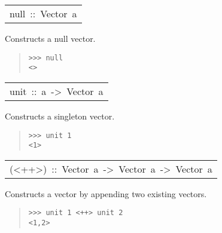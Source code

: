\begin{haddockdesc}
\item[\begin{tabular}{@{}l}
null\ ::\ Vector\ a
\end{tabular}]\haddockbegindoc
Constructs a null vector.\par
\begin{quote}
{\haddockverb\begin{verbatim}
>>> null
<>

\end{verbatim}}
\end{quote}
\end{haddockdesc}
\begin{haddockdesc}
\item[\begin{tabular}{@{}l}
unit\ ::\ a\ ->\ Vector\ a
\end{tabular}]\haddockbegindoc
Constructs a singleton vector.\par
\begin{quote}
{\haddockverb\begin{verbatim}
>>> unit 1
<1>

\end{verbatim}}
\end{quote}
\end{haddockdesc}
\begin{haddockdesc}
\item[\begin{tabular}{@{}l}
(<++>)\ ::\ Vector\ a\ ->\ Vector\ a\ ->\ Vector\ a
\end{tabular}]\haddockbegindoc
Constructs a vector by appending two existing vectors.\par
\begin{quote}
{\haddockverb\begin{verbatim}
>>> unit 1 <++> unit 2
<1,2>

\end{verbatim}}
\end{quote}
\end{haddockdesc}
